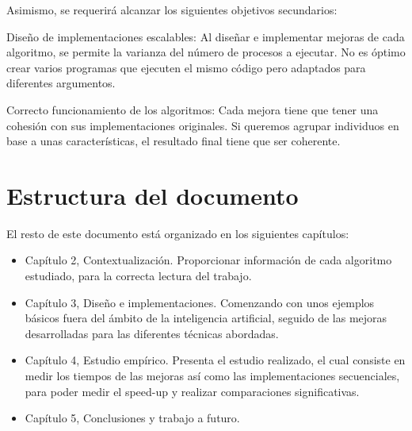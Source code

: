 Asimismo, se requerirá alcanzar los siguientes objetivos secundarios:

Diseño de implementaciones escalables: Al diseñar e implementar mejoras de cada algoritmo, se permite la varianza del número de procesos a ejecutar. No es óptimo crear varios programas que ejecuten el mismo código pero adaptados para diferentes argumentos.

Correcto funcionamiento de los algoritmos: Cada mejora tiene que tener una cohesión con sus implementaciones originales. Si queremos agrupar individuos en base a unas características, el resultado final tiene que ser coherente.




\section{Estructura del documento}
El resto de este documento está organizado en los siguientes capítulos:

\begin{itemize}
	\item Capítulo 2, Contextualización. Proporcionar información de cada algoritmo estudiado, para la correcta lectura del trabajo.
	\item Capítulo 3, Diseño e implementaciones. Comenzando con unos ejemplos básicos fuera del ámbito de la inteligencia artificial, seguido de las mejoras desarrolladas para las diferentes técnicas abordadas.
	\item Capítulo 4, Estudio empírico. Presenta el estudio realizado, el cual consiste en medir los tiempos de las mejoras así como las implementaciones secuenciales, para poder medir el speed-up y realizar comparaciones significativas.
	\item Capítulo 5, Conclusiones y trabajo a futuro.
\end{itemize}














